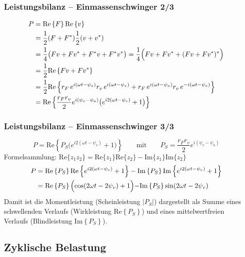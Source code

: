\documentclass[hyperref={pdfpagemode=FullScreen, colorlinks=false}]{beamer}
\begin{document}
\begin{frame}
\frametitle{Leistungsbilanz {\normalsize -- Einmassenschwinger 2/3}}
 \begin{align*}
  P&=\mathrm{Re}\left\{F \right\}\mathrm{Re}\left\{v\right\}\\
  &=\frac{1}{2}(F+F^*)\frac{1}{2}(v+v^*)\\
  &=\frac{1}{4}\bigl(Fv+Fv^*+F^*v+F^*v^*\bigr)=\frac{1}{4}\Bigl(Fv+Fv^*+(Fv+Fv^*)^*\Bigr)\\
  &=\frac{1}{2}\mathrm{Re}\left\{Fv+Fv^*\right\}\\
  &=\frac{1}{2}\mathrm{Re}\left\{r_F\,e^{i(\omega t-\psi_a)} r_v\,e^{i(\omega t-\psi_v)}
  +r_F\,e^{i(\omega t-\psi_a)} r_v\,e^{-i(\omega t-\psi_v)} \right\}\\
  &=\mathrm{Re}\left\{\frac{r_F r_v}{2}e^{i(\psi_v-\psi_a)}
  \bigl( e^{i2(\omega t - \psi_v)} + 1  \bigr)
   \right\}\\
 \end{align*}

\end{frame}

\begin{frame}
\frametitle{Leistungsbilanz {\normalsize -- Einmassenschwinger 3/3}}
\begin{equation*}
   P=\mathrm{Re}\left\{P_S
  \bigl( e^{i2(\omega t - \psi_v)} + 1  \bigr) \right\} 
  \qquad
  \text{mit}
  \qquad
  P_S=\frac{r_F r_v}{2}e^{i(\psi_v-\psi_a)}
\end{equation*}
Formelsammlung: \quad $\mathrm{Re}\{z_1 z_2\}=\mathrm{Re}\{z_1\}\mathrm{Re}\{z_2\} - \mathrm{Im}\{z_1\}\mathrm{Im}\{z_2\}$
\begin{align*}
   P&=\mathrm{Re}\left\{P_S\right\}\mathrm{Re}\left\{ e^{i2(\omega t - \psi_v)} + 1  \right\}
   -\mathrm{Im}\left\{P_S\right\}\mathrm{Im}\left\{ e^{i2(\omega t - \psi_v)} + 1  \right\}\\
   &=\mathrm{Re}\left\{P_S\right\}\Bigl( \cos(2\omega t - 2\psi_v) + 1 \Bigl)
   -\mathrm{Im}\left\{P_S \right\} \sin(2\omega t- 2\psi_v)
\end{align*}
Damit ist die Momentleistung (Scheinleistung $|P_S|$) dargestellt als Summe eines schwellenden Verlaufs (Wirkleistung $\mathrm{Re}\left\{P_S\right\}$) und eines mittelwertfreien Verlaufs (Blindleistung $\mathrm{Im}\left\{P_S \right\}$). 

\end{frame}


\subsection{Zyklische Belastung}
\end{document}
